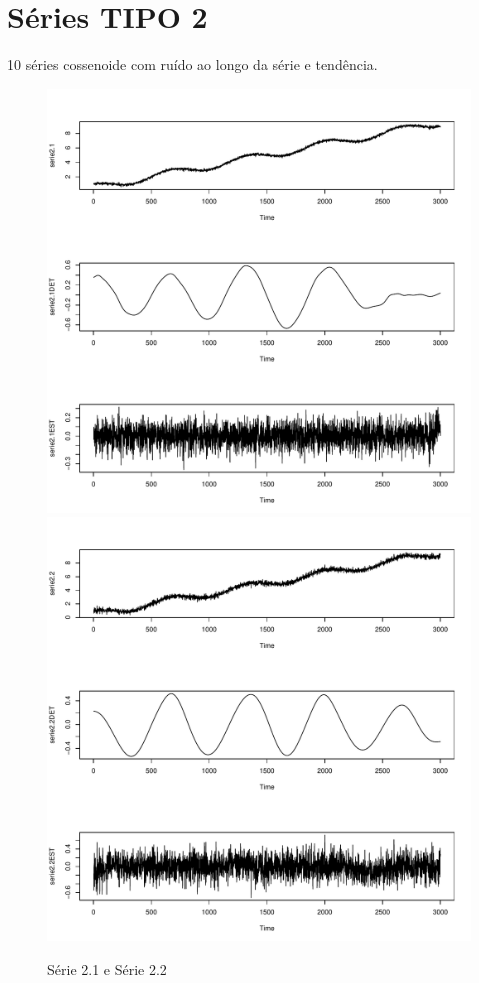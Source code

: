 \section{Séries TIPO 2}
10 séries cossenoide com ruído ao longo da série e tendência.
\graphicspath{{imagens/}}
\begin{figure}[H]
\begin{center}
  \includegraphics[scale=0.43]{serie2_1.pdf} \quad
  \includegraphics[scale=0.43]{serie2_2.pdf}
  \caption{Série 2.1 e Série 2.2}

\end{center}
\end{figure}

